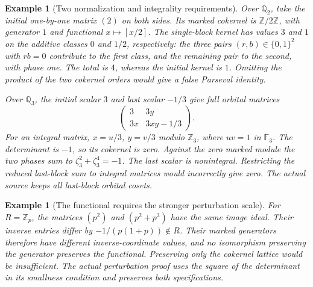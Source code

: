 \documentclass[11pt,a4paper]{article}
\newtheorem{example}[proposition]{Example}
\theoremstyle{remark}
\newcommand{\Z}{\mathbb Z}
\newcommand{\Q}{\mathbb Q}
\begin{document}
\begin{example}[Two normalization and integrality requirements]
Over $\Q_2$, take the initial one-by-one matrix $(2)$ on both
sides. Its marked cokernel is $\Z/2\Z$, with generator $1$
and functional $x\mapsto[x/2]$. The single-block kernel has
values $3$ and $1$ on the additive classes $0$ and $1/2$,
respectively: the three pairs $(r,b)\in\{0,1\}^2$ with
$rb=0$ contribute to the first class, and the remaining pair
to the second, with phase one. The total is $4$, whereas the
initial kernel is $1$. Omitting the product of the two
cokernel orders would give a false Parseval identity.

Over $\Q_3$, the initial scalar $3$ and last scalar $-1/3$
give full orbital matrices
\[
 \begin{pmatrix}3&3y\\3x&3xy-1/3\end{pmatrix}.
\]
For an integral matrix, $x=u/3$, $y=v/3$ modulo $\Z_3$,
where $uv=1$ in $\mathbb F_3$. The determinant is $-1$,
so its cokernel is zero. Against the zero marked module the
two phases sum to $\zeta_3^2+\zeta_3^4=-1$.
The last scalar is nonintegral. Restricting the reduced
last-block sum to integral matrices would incorrectly give
zero. The actual source keeps all last-block orbital cosets.
\end{example}

\begin{example}[The functional requires the stronger perturbation scale]
For $R=\Z_p$, the matrices $(p^2)$ and $(p^2+p^3)$ have
the same image ideal. Their inverse entries differ by
$-1/(p(1+p))\notin R$. Their marked generators therefore
have different inverse-coordinate values, and no isomorphism
preserving the generator preserves the functional. Preserving
only the cokernel lattice would be insufficient. The actual
perturbation proof uses the square of the determinant in
its smallness condition and preserves both specifications.
\end{example}
\end{document}
